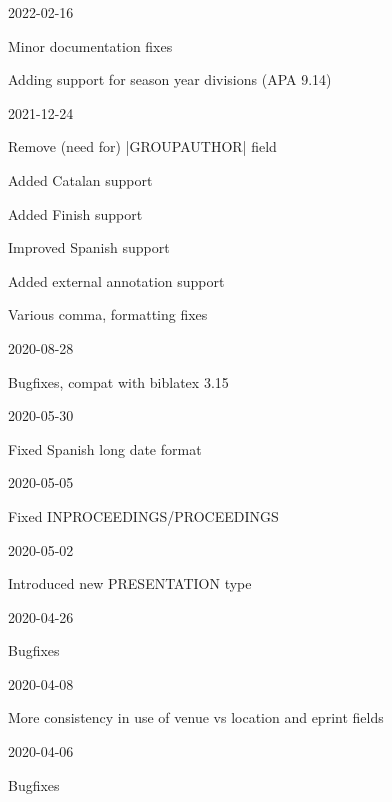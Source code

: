 \documentclass{ltxdockit}
\begin{document}
\begin{changelog}

\begin{release}{9.16}{2022-02-16}
\item Minor documentation fixes
\item Adding support for season year divisions (APA 9.14)
\end{release}
  
\begin{release}{9.15}{2021-12-24}
\item Remove (need for) |GROUPAUTHOR| field
\item Added Catalan support
\item Added Finish support
\item Improved Spanish support
\item Added external annotation support
\item Various comma, formatting fixes
\end{release}

\begin{release}{9.14}{2020-08-28}
\item Bugfixes, compat with biblatex 3.15
\end{release}

\begin{release}{9.13}{2020-05-30}
\item Fixed Spanish long date format
\end{release}
  
\begin{release}{9.12}{2020-05-05}
\item Fixed INPROCEEDINGS/PROCEEDINGS
\end{release}

\begin{release}{9.11}{2020-05-02}
\item Introduced new PRESENTATION type
\end{release}

\begin{release}{9.10}{2020-04-26}
\item Bugfixes
\end{release}

\begin{release}{9.9}{2020-04-08}
\item More consistency in use of venue vs location and eprint fields
\end{release}

\begin{release}{9.8}{2020-04-06}
\item Bugfixes
\end{release}


\end{changelog}
\end{document}

